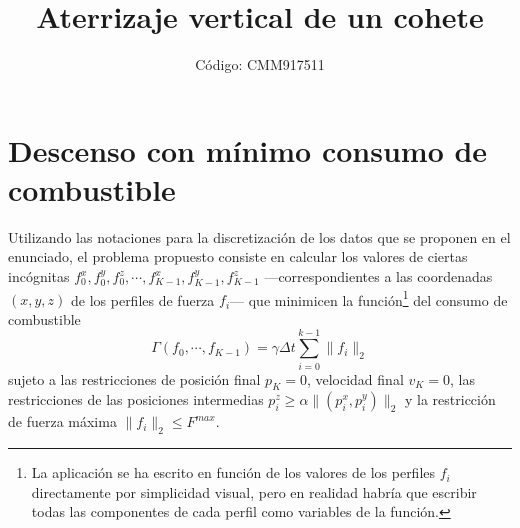 \documentclass[10pt,a4paper]{article}
\author{Código: CMM917511}
\title{Aterrizaje vertical de un cohete}
\begin{document}
\maketitle

\section{Descenso con mínimo consumo de combustible}
Utilizando las notaciones para la discretización de los datos que se proponen en el enunciado, el problema propuesto consiste en calcular los valores de ciertas incógnitas $f_0^x, f_0^y, f_0^z, \cdots, f_{K-1}^x, f_{K-1}^y, f_{K-1}^z$ ---correspondientes a las coordenadas $(x,y,z)$ de los perfiles de fuerza $f_i$--- que minimicen la función\footnote{La aplicación se ha escrito en función de los valores de los perfiles $f_i$ directamente por simplicidad visual, pero en realidad habría que escribir todas las componentes de cada perfil como variables de la función.} del consumo de combustible
\[
\Gamma(f_0, \cdots, f_{K-1}) = \gamma \Delta t \sum_{i=0}^{k-1} \parallel  f_i \parallel_2
\]
sujeto a las restricciones de posición final $p_K = 0$, velocidad final $v_K = 0$, las restricciones de las posiciones intermedias $p_i^z \geq \alpha \parallel (p_i^x,p_i^y)\parallel_2$ y la restricción de fuerza máxima $\parallel f_i \parallel_2 \leq F^{max}$.
\end{document}
